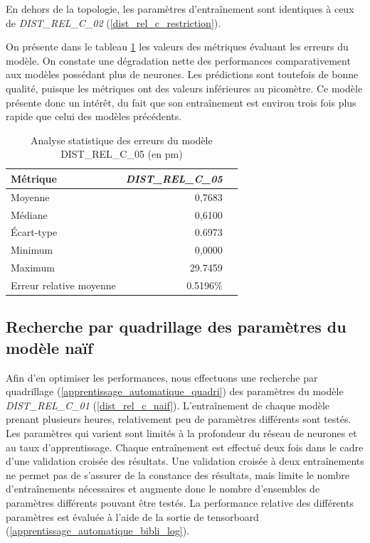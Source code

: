 \par En dehors de la topologie, les paramètres d'entraînement sont identiques à ceux de \emph{DIST\_REL\_C\_02} (\ref{dist_rel_c_restriction}).\\

\par On présente dans le tableau \ref{tstats_dist_rel_c_05} les valeurs des métriques évaluant les erreurs du modèle. On constate une dégradation nette des performances comparativement aux modèles possédant plus de neurones. Les prédictions sont toutefois de bonne qualité, puisque les métriques ont des valeurs inférieures au picomètre. Ce modèle présente donc un intérêt, du fait que son entraînement est environ trois fois plus rapide que celui des modèles précédents.

\begin{table}
	\centering
	\begin{tabular}{|l|r|r|}
		\hline
		\textbf{Métrique}& \textbf{\emph{DIST\_REL\_C\_05}} \\ \hline
		Moyenne & 0,7683\\ \hline
		Médiane & 0,6100 \\ \hline
		Écart-type  & 0.6973 \\ \hline
		Minimum & 0,0000\\ \hline
		Maximum & 29.7459\\ \hline
		Erreur relative moyenne & 0.5196\%\\ \hline
	\end{tabular}
	
	\caption{Analyse statistique des erreurs du modèle DIST\_REL\_C\_05 (en pm)}
	\label{tstats_dist_rel_c_05}
\end{table}

\subsection{Recherche par quadrillage des paramètres du modèle naïf}

\label{dist_rel_quadri}

\par Afin d'en optimiser les performances, nous effectuons une recherche par quadrillage (\ref{apprentissage_automatique_quadri}) des paramètres du modèle \emph{DIST\_REL\_C\_01} (\ref{dist_rel_c_naif}). L'entraînement de chaque modèle prenant plusieurs heures, relativement peu de paramètres différents sont testés. Les paramètres qui varient sont limités à la profondeur du réseau de neurones et au taux d'apprentissage. Chaque entraînement est effectué deux fois dans le cadre d'une validation croisée des résultats. Une validation croisée à deux entraînements ne permet pas de s'assurer de la constance des résultats, mais limite le nombre d'entraînements nécessaires et augmente donc le nombre d'ensembles de paramètres différents pouvant être testés. La performance relative des différents paramètres est évaluée à l'aide de la sortie de tensorboard (\ref{apprentissage_automatique_bibli_log}).\\

